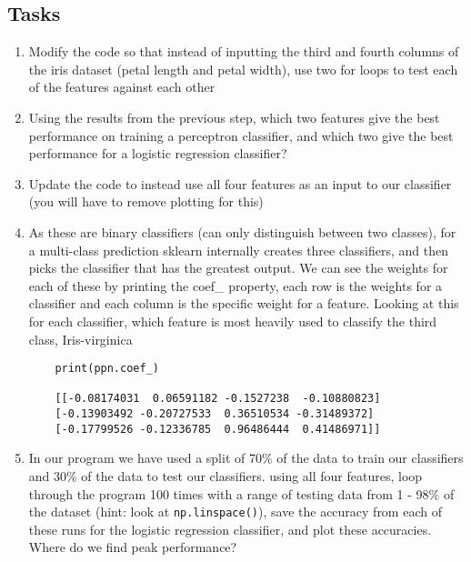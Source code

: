 \documentclass[12pt]{article}
\def\code#1{\texttt{#1}} %
\begin{document}
\subsection{Tasks}
\begin{enumerate}
\item Modify the code so that instead of inputting the third and fourth columns of the iris dataset (petal length and petal width), use two for loops to test each of the features against each other 


\item Using the results from the previous step, which two features give the best performance on training a perceptron classifier, and which two give the best performance for a logistic regression classifier?

\item Update the code to instead use all four features as an input to our classifier (you will have to remove plotting for this)

\item As these are binary classifiers (can only distinguish between two classes), for a multi-class prediction sklearn internally creates three classifiers, and then picks the classifier that has the greatest output. We can see the weights for each of these by printing the coef\_ property, each row is the weights for a classifier and each column is the specific weight for a feature. Looking at this for each classifier, which feature is most heavily used to classify the third class, Iris-virginica
\begin{verbatim}
    print(ppn.coef_)

    [[-0.08174031  0.06591182 -0.1527238  -0.10880823]
    [-0.13903492 -0.20727533  0.36510534 -0.31489372]
    [-0.17799526 -0.12336785  0.96486444  0.41486971]]
\end{verbatim}


\item In our program we have used a split of 70\% of the data to train our classifiers and 30\% of the data to test our classifiers. using all four features, loop through the program 100 times with a range of testing data from 1 - 98\% of the dataset (hint: look at \code{np.linspace()}), save the accuracy from each of these runs for the logistic regression classifier, and plot these accuracies. Where do we find peak performance?


\end{enumerate}
\end{document}
